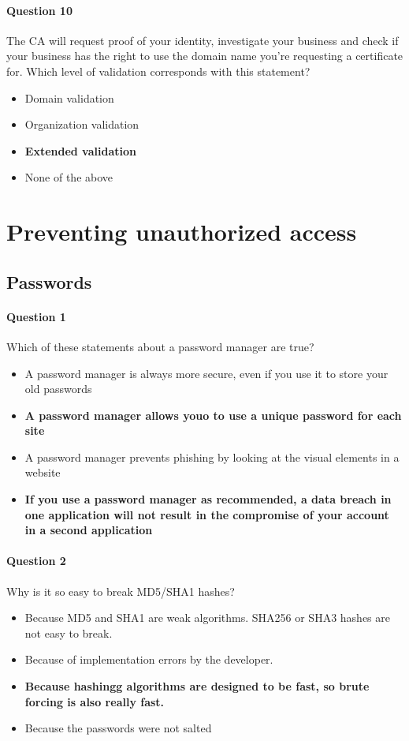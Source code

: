 \documentclass[titlepage]{article}
\begin{document}
    \paragraph{Question 10} The CA will request proof of your identity, investigate your business and check if your business has the right to use the domain name you're requesting a certificate for. Which level of validation corresponds with this statement?
    \begin{itemize}
        \item Domain validation
        \item Organization validation
        \item \textbf{Extended validation} \checkmark
        \item None of the above
    \end{itemize}



    \newpage
    \section{Preventing unauthorized access}
    \subsection{Passwords}
    \paragraph{Question 1} Which of these statements about a password manager are true?
    \begin{itemize}
        \item A password manager is always more secure, even if you use it to store your old passwords
        \item \textbf{A password manager allows youo to use a unique password for each site} \checkmark
        \item A password manager prevents phishing by looking at the visual elements in a website
        \item \textbf{If you use a password manager as recommended, a data breach in one application will not result in the compromise of your account in a second application} \checkmark
    \end{itemize}
    \paragraph{Question 2} Why is it so easy to break MD5/SHA1 hashes?
    \begin{itemize}
        \item Because MD5 and SHA1 are weak algorithms. SHA256 or SHA3 hashes are not easy to break.
        \item Because of implementation errors by the developer.
        \item \textbf{Because hashingg algorithms are designed to be fast, so brute forcing is also really fast.} \checkmark
        \item Because the passwords were not salted
    \end{itemize}
\end{document}
